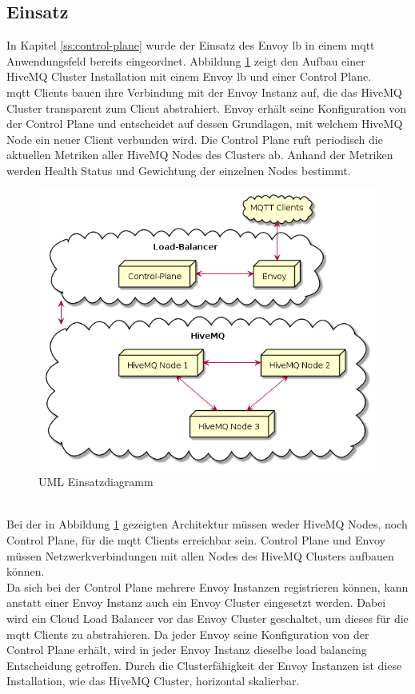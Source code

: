 \subsection{Einsatz}
In Kapitel \ref{ss:control-plane} wurde der Einsatz des Envoy \acl{lb} in einem \ac{mqtt} Anwendungsfeld bereits eingeordnet. Abbildung \ref{fig:deployment-diagram} zeigt den Aufbau einer HiveMQ Cluster Installation mit einem Envoy \ac{lb} und einer Control Plane.
\\
\ac{mqtt} Clients bauen ihre Verbindung mit der Envoy Instanz auf, die das HiveMQ Cluster transparent zum Client abstrahiert. Envoy erhält seine Konfiguration von der Control Plane und entscheidet auf dessen Grundlagen, mit welchem HiveMQ Node ein neuer Client verbunden wird. Die Control Plane ruft periodisch die aktuellen Metriken aller HiveMQ Nodes des Clusters ab. Anhand der Metriken werden Health Status und Gewichtung der einzelnen Nodes bestimmt.
\begin{figure}
    \centering
    \includegraphics[scale=0.6]{gen/deployment.png}
    \caption{UML Einsatzdiagramm}
    \label{fig:deployment-diagram}
\end{figure}
\\
Bei der in Abbildung \ref{fig:deployment-diagram} gezeigten Architektur müssen weder HiveMQ Nodes, noch Control Plane, für die \ac{mqtt} Clients erreichbar sein. Control Plane und Envoy müssen Netzwerkverbindungen mit allen Nodes des HiveMQ Clusters aufbauen können.
\\
Da sich bei der Control Plane mehrere Envoy Instanzen registrieren können, kann anstatt einer Envoy Instanz auch ein Envoy Cluster eingesetzt werden. Dabei wird ein Cloud Load Balancer vor das Envoy Cluster geschaltet, um dieses für die \ac{mqtt} Clients zu abstrahieren. Da jeder Envoy seine Konfiguration von der Control Plane erhält, wird in jeder Envoy Instanz dieselbe load balancing Entscheidung getroffen. Durch die Clusterfähigkeit der Envoy Instanzen ist diese Installation, wie das HiveMQ Cluster, horizontal skalierbar.
\newpage

